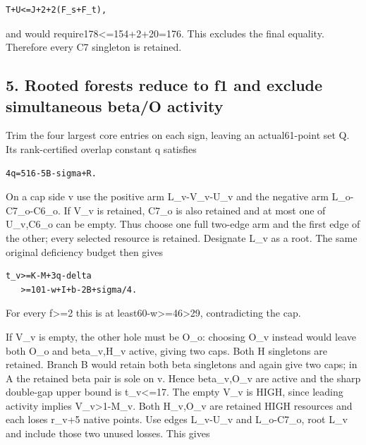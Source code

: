 \documentclass[10pt,a4paper]{article}
\theoremstyle{definition}
\begin{document}
\begin{lstlisting}
T+U<=J+2+2(F_s+F_t),
\end{lstlisting}

and would require178\textless=\allowbreak{}154+\allowbreak{}2+\allowbreak{}20=\allowbreak{}176. This excludes the final
equality. Therefore every C7 singleton is retained.

\hypertarget{rooted-forests-reduce-to-f1-and-exclude-simultaneous-betao-activity}{%
\subsection{5. Rooted forests reduce to f1 and exclude simultaneous
beta/O
activity}\label{rooted-forests-reduce-to-f1-and-exclude-simultaneous-betao-activity}}

Trim the four largest core entries on each sign,\allowbreak{} leaving an
actual61-point set Q. Its rank-certified overlap constant q satisfies

\begin{lstlisting}
4q=516-5B-sigma+R.
\end{lstlisting}

On a cap side v use the positive arm L\_\allowbreak{}v-V\_\allowbreak{}v-U\_\allowbreak{}v and the negative arm
L\_\allowbreak{}o-C7\_\allowbreak{}o-C6\_\allowbreak{}o. If V\_\allowbreak{}v is retained,\allowbreak{} C7\_\allowbreak{}o is also retained and at
most one of U\_\allowbreak{}v,\allowbreak{}C6\_\allowbreak{}o can be empty. Thus choose one full two-edge arm
and the first edge of the other; every selected resource is retained.
Designate L\_\allowbreak{}v as a root. The same original deficiency budget then gives

\begin{lstlisting}
t_v>=K-M+3q-delta
   >=101-w+I+b-2B+sigma/4.
\end{lstlisting}

For every f\textgreater=\allowbreak{}2 this is at
least60-w\textgreater=\allowbreak{}46\textgreater29,\allowbreak{} contradicting the cap.

If V\_\allowbreak{}v is empty,\allowbreak{} the other hole must be O\_\allowbreak{}o: choosing O\_\allowbreak{}v instead
would leave both O\_\allowbreak{}o and beta\_\allowbreak{}v,\allowbreak{}H\_\allowbreak{}v active,\allowbreak{} giving two caps. Both H
singletons are retained. Branch B would retain both beta singletons and
again give two caps; in A the retained beta pair is sole on v. Hence
beta\_\allowbreak{}v,\allowbreak{}O\_\allowbreak{}v are active and the sharp double-gap upper bound is
t\_\allowbreak{}v\textless=\allowbreak{}17. The empty V\_\allowbreak{}v is HIGH,\allowbreak{} since leading activity implies
V\_\allowbreak{}v\textgreater1-M\_\allowbreak{}v. Both H\_\allowbreak{}v,\allowbreak{}O\_\allowbreak{}v are retained HIGH resources and
each loses r\_\allowbreak{}v+\allowbreak{}5 native points. Use edges L\_\allowbreak{}v-U\_\allowbreak{}v and L\_\allowbreak{}o-C7\_\allowbreak{}o,\allowbreak{}
root L\_\allowbreak{}v and include those two unused losses. This gives
\end{document}
